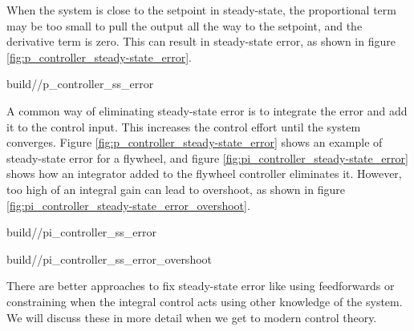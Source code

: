 When the \gls{system} is close to the \gls{setpoint} in steady-state, the
proportional term may be too small to pull the \gls{output} all the way to the
\gls{setpoint}, and the derivative term is zero. This can result in
\gls{steady-state error}, as shown in figure
\ref{fig:p_controller_steady-state_error}.

\begin{svg}{build/\chapterpath/p_controller_ss_error}
  \caption{P controller on a flywheel with steady-state error}
  \label{fig:p_controller_steady-state_error}
\end{svg}

A common way of eliminating \gls{steady-state error} is to integrate the
\gls{error} and add it to the \gls{control input}. This increases the
\gls{control effort} until the \gls{system} converges. Figure
\ref{fig:p_controller_steady-state_error} shows an example of
\gls{steady-state error} for a flywheel, and figure
\ref{fig:pi_controller_steady-state_error} shows how an integrator added to the
flywheel controller eliminates it. However, too high of an integral gain can
lead to overshoot, as shown in figure
\ref{fig:pi_controller_steady-state_error_overshoot}.

\begin{bookfigure}
  \begin{minisvg}{2}{build/\chapterpath/pi_controller_ss_error}
    \caption{PI controller on a flywheel without steady-state error}
    \label{fig:pi_controller_steady-state_error}
  \end{minisvg}
  \hfill
  \begin{minisvg}{2}{build/\chapterpath/pi_controller_ss_error_overshoot}
    \caption{PI controller on a flywheel with overshoot from large $K_i$ gain}
    \label{fig:pi_controller_steady-state_error_overshoot}
  \end{minisvg}
\end{bookfigure}

\begin{remark}
  There are better approaches to fix \gls{steady-state error} like using
  feedforwards or constraining when the integral control acts using other
  knowledge of the \gls{system}. We will discuss these in more detail when we
  get to modern control theory.
\end{remark}

